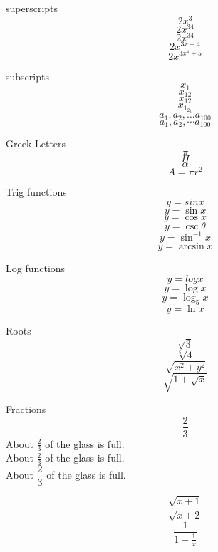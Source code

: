 \documentclass[11pt]{article}
\begin{document}
 superscripts $$2x^3$$
 $$2x^34$$ %
 $$2x^{34}$$
 $$2x^{3x+4}$$
 $$2x^{3x^4+5}$$
 
 subscripts 
 $$x_1$$
 $$x_12$$
 $$x_{12}$$
 $$x_{1_{2_{3}}}$$
 $$a_1,a_2, \ldots a_{100}$$ %
 $$a_1,a_2, \cdots a_{100}$$ %
 
 Greek Letters
 $$\pi$$
 $$\Pi$$
 $$\alpha$$
 $$A=\pi r^2$$
 
 Trig functions
 $$y=sin x$$ %
 $$y=\sin x$$ %
 $$y=\cos x$$
 $$y=\csc \theta$$
 $$y=\sin^{-1} x$$
 $$y=\arcsin x$$
 
 
 Log functions
 $$y=log x$$ %
 $$y=\log x$$
 $$y=\log_5 x$$
 $$y=\ln x$$
 
 
 Roots
 $$\sqrt{3}$$
 $$\sqrt[5]{4}$$
 $$\sqrt{x^2+y^2}$$
 $$\sqrt{  1+\sqrt{x}  }$$
 
 
 Fractions
 $$\frac{2}{3}$$
 About $\displaystyle \frac{2}{3}$ of the glass is full.\\[16pt] %
 About $\frac{2}{3}$ of the glass is full. \\[6pt] 
 About $\dfrac{2}{3}$ of the glass is full. %
 
 $$\frac{\sqrt{x+1}}{\sqrt{x+2}}$$
 $$\frac{1}{1+\frac{1}{x}}$$
\end{document}

